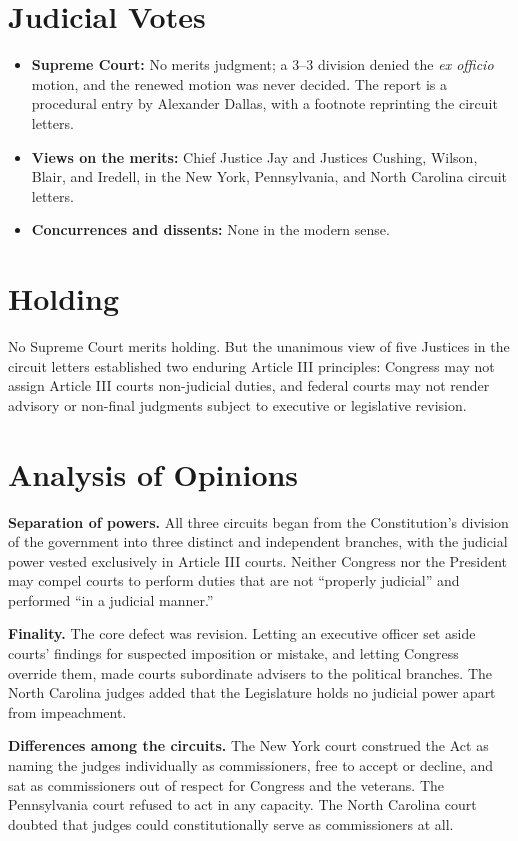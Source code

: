 \documentclass[12pt]{article}
\begin{document}
\section{Judicial Votes}

\begin{itemize}
\item \textbf{Supreme Court:} No merits judgment; a 3--3 division denied the \textit{ex officio} motion, and the renewed motion was never decided. The report is a procedural entry by Alexander Dallas, with a footnote reprinting the circuit letters.
\item \textbf{Views on the merits:} Chief Justice Jay and Justices Cushing, Wilson, Blair, and Iredell, in the New York, Pennsylvania, and North Carolina circuit letters.
\item \textbf{Concurrences and dissents:} None in the modern sense.
\end{itemize}

\section{Holding}

No Supreme Court merits holding. But the unanimous view of five Justices in the circuit letters established two enduring Article III principles: Congress may not assign Article III courts non-judicial duties, and federal courts may not render advisory or non-final judgments subject to executive or legislative revision.

\section{Analysis of Opinions}

\textbf{Separation of powers.} All three circuits began from the Constitution's division of the government into three distinct and independent branches, with the judicial power vested exclusively in Article III courts. Neither Congress nor the President may compel courts to perform duties that are not ``properly judicial'' and performed ``in a judicial manner.''

\textbf{Finality.} The core defect was revision. Letting an executive officer set aside courts' findings for suspected imposition or mistake, and letting Congress override them, made courts subordinate advisers to the political branches. The North Carolina judges added that the Legislature holds no judicial power apart from impeachment.

\textbf{Differences among the circuits.} The New York court construed the Act as naming the judges individually as commissioners, free to accept or decline, and sat as commissioners out of respect for Congress and the veterans. The Pennsylvania court refused to act in any capacity. The North Carolina court doubted that judges could constitutionally serve as commissioners at all.
\end{document}
